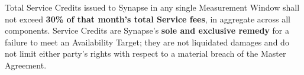 \begin{metricbox}
Total Service Credits issued to Synapse in any single Measurement Window shall not
exceed \textbf{30\% of that month's total Service fees}, in aggregate across all
components. Service Credits are Synapse's \textbf{sole and exclusive remedy} for a
failure to meet an Availability Target; they are not liquidated damages and do not
limit either party's rights with respect to a material breach of the Master Agreement.
\end{metricbox}

\vspace{6pt}
